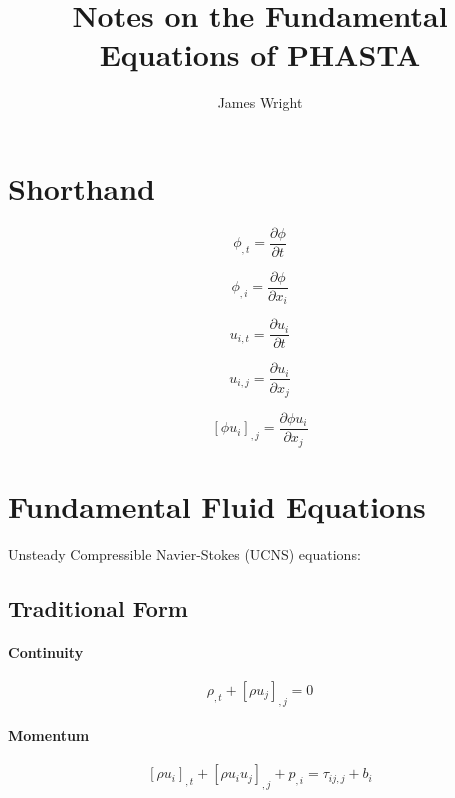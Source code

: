 \documentclass[11pt, letterpaper, twoside]{article}
\title{Notes on the Fundamental Equations of PHASTA}
\author{James Wright}
\begin{document}
\maketitle

\section{Shorthand}
    \begin{equation}
        \phi_{,t} = \frac{\partial \phi}{\partial t}
    \end{equation}

    \begin{equation}
        \phi_{,i} = \frac{\partial \phi}{\partial x_i}
    \end{equation}

    \begin{equation}
        u_{i,t} = \frac{\partial u_i}{\partial t}
    \end{equation}

    \begin{equation}
        u_{i,j} = \frac{\partial u_i}{\partial x_j}
    \end{equation}

    \begin{equation}
        \left[\phi u_i \right]_{,j} = \frac{\partial \phi u_i}{\partial x_j}
    \end{equation}

\section{Fundamental Fluid Equations}
Unsteady Compressible Navier-Stokes (UCNS) equations:

    \subsection{Traditional Form}
    \paragraph{Continuity}
        \begin{equation}\label{eq:fund_continuity}
            \rho_{,t} + \left[\rho u_j \right]_{,j} = 0
        \end{equation}

    \paragraph{Momentum}
        \begin{equation}\label{eq:fund_momentum}
            \left[\rho u_i \right]_{,t} + \left[\rho u_i u_j \right]_{,j} + p_{,i} = \tau_{ij,j} + b_i
        \end{equation}
        
\end{document}
